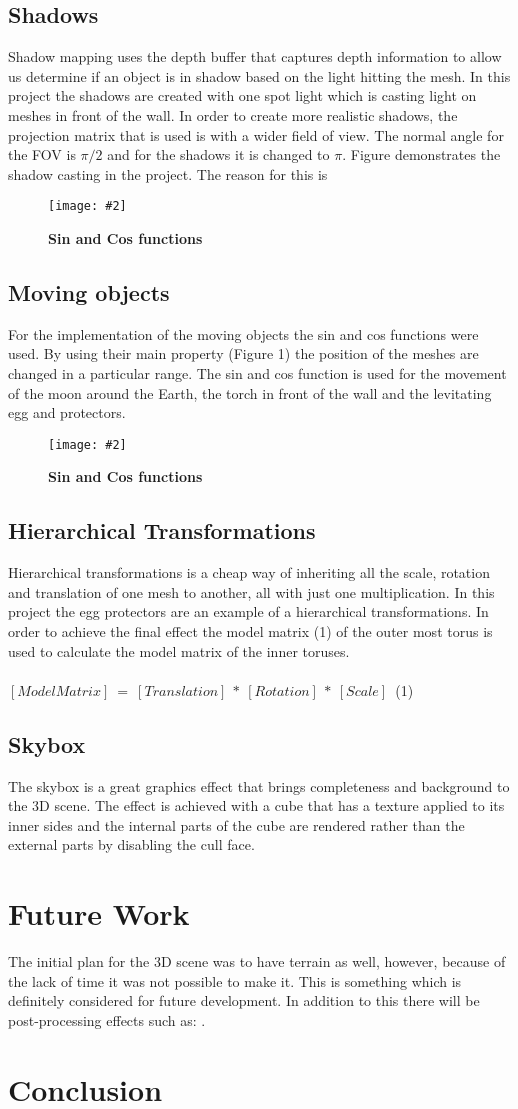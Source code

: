 \documentclass[10pt, a4paper]{article}
\newcommand{\figuremacro}[5]{
    \begin{figure}[#1]
        \centering
        \texttt{[image: \#2]}
        \caption[#3]{\textbf{#3}#4}
        \label{fig:#2}
    \end{figure}
}
\begin{document}
	\subsection{Shadows}
	Shadow mapping uses the depth buffer that captures depth information to allow us determine if an object is in shadow based on the light hitting the mesh. In this project the shadows are created with one spot light which is casting light on meshes in front of the wall. In order to create more realistic shadows, the projection matrix that is used is with a wider field of view. The normal angle for the FOV is $\pi/2$ and for the shadows it is changed to $\pi$. Figure demonstrates the shadow casting in the project.  The reason for this is
	\figuremacro{h}{shadowStick}{Sin and Cos functions}{ }{1.0}
	\subsection{Moving objects}
	For the implementation of the moving objects the sin and cos functions were used. By using their main property (Figure 1) the position of the meshes are changed in a particular range. The sin and cos function is used for the movement of the moon around the Earth, the torch in front of the wall and the levitating egg and protectors.	
	\figuremacro{h}{sincos}{Sin and Cos functions}{ }{1.0}
	\subsection{Hierarchical Transformations}
	Hierarchical transformations is a cheap way of inheriting all the scale, rotation and translation of one mesh to another, all with just one multiplication. In this project the egg protectors are an example of a hierarchical transformations. In order to achieve the final effect the model matrix (1) of the outer most torus is used to calculate the model matrix of the inner toruses.\\\\
	$[ModelMatrix]~=~[Translation]~*~[Rotation]~*~[Scale]$~(1)
	\subsection{Skybox}
	The skybox is a great graphics effect that brings completeness and background to the 3D scene. The effect is achieved with a cube that has a texture applied to its inner sides and the internal parts of the cube are rendered rather than the external parts by disabling the cull face.
	
	\section{Future Work}
	The initial plan for the 3D scene was to have terrain as well, however, because of the lack of time it was not possible to make it. This is something which is definitely considered  for future development. In addition to this there will be post-processing effects such as: .
	\section{Conclusion}	


		
\end{document}
